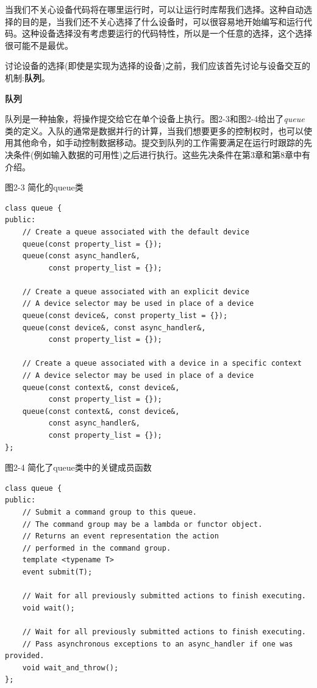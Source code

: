 
当我们不关心设备代码将在哪里运行时，可以让运行时库帮我们选择。这种自动选择的目的是，当我们还不关心选择了什么设备时，可以很容易地开始编写和运行代码。这种设备选择没有考虑要运行的代码特性，所以是一个任意的选择，这个选择很可能不是最优。\par

讨论设备的选择(即使是实现为选择的设备)之前，我们应该首先讨论与设备交互的机制:\textbf{队列}。\par

\hspace*{\fill} \par %
\textbf{队列}

队列是一种抽象，将操作提交给它在单个设备上执行。图2-3和图2-4给出了\textit{queue}类的定义。入队的通常是数据并行的计算，当我们想要更多的控制权时，也可以使用其他命令，如手动控制数据移动。提交到队列的工作需要满足在运行时跟踪的先决条件(例如输入数据的可用性)之后进行执行。这些先决条件在第3章和第8章中有介绍。\par

\hspace*{\fill} \par %
图2-3 简化的queue类
\begin{lstlisting}[caption={}]
class queue {
public:
	// Create a queue associated with the default device
	queue(const property_list = {});
	queue(const async_handler&, 
		  const property_list = {});
	
	// Create a queue associated with an explicit device
	// A device selector may be used in place of a device
	queue(const device&, const property_list = {});
	queue(const device&, const async_handler&, 
	      const property_list = {});
	
	// Create a queue associated with a device in a specific context
	// A device selector may be used in place of a device
	queue(const context&, const device&, 
		  const property_list = {});
	queue(const context&, const device&, 
		  const async_handler&, 
		  const property_list = {});
};
\end{lstlisting}

\hspace*{\fill} \par %
图2-4 简化了queue类中的关键成员函数
\begin{lstlisting}[caption={}]
class queue {
public:
	// Submit a command group to this queue.
	// The command group may be a lambda or functor object.
	// Returns an event representation the action 
	// performed in the command group.
	template <typename T>
	event submit(T);
	
	// Wait for all previously submitted actions to finish executing.
	void wait();
	
	// Wait for all previously submitted actions to finish executing.
	// Pass asynchronous exceptions to an async_handler if one was provided.
	void wait_and_throw();
};
\end{lstlisting}	
	
